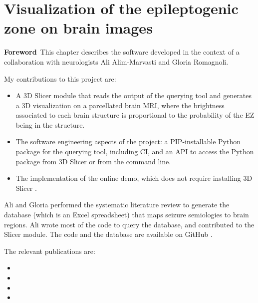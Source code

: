 \chapter[Visualization of the epileptogenic zone on brain images]{Visualization of the epileptogenic zone on brain images}

\label{chap:svt}

\minitoc


\begin{center}
  \begin{minipage}[b]{0.9\linewidth}
    \small
    \textbf{Foreword\,}
    This chapter describes the software developed in the context of a collaboration with neurologists Ali Alim-Marvasti and Gloria Romagnoli.

    My contributions to this project are:
    \begin{itemize}
      \item A 3D Slicer module \cite{fedorov_3d_2012} that reads the output of the querying tool and generates a 3D visualization on a parcellated brain \ac{MRI}, where the brightness associated to each brain structure is proportional to the probability of the \ac{EZ} being in the structure.
      \item The software engineering aspects of the project: a \ac{PIP}-installable Python package for the querying tool, including \ac{CI}, and an \ac{API} to access the Python package from 3D Slicer or from the command line.
      \item The implementation of the online demo, which does not require installing 3D Slicer%
      .
    \end{itemize}
  \end{minipage}

  \begin{minipage}[b]{0.9\linewidth}
    \small
    Ali and Gloria performed the systematic literature review to generate the database (which is an Excel spreadsheet) that maps seizure semiologies to brain regions.
    Ali wrote most of the code to query the database, and contributed to the Slicer module.
    The code and the database are available on GitHub%
    \fnurl{\svtgithub}.

    The relevant publications are:
    \begin{itemize}
      \item {}
      \item {}
      \item {}
      \item {}
    \end{itemize}

  \end{minipage}
\end{center}

\acresetall
\bodyspacing





\onehalfspacing %
